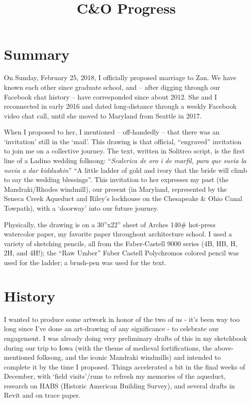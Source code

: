 ﻿\documentclass[letterpaper, 12pt, landscape]{ProgressBook}
\title{C\&O Progress}
\begin{document}
\fancyhead{} %
\cfoot{\makebox[\textwidth][c]{\thepage}}

\section*{Summary}

On Sunday, February 25, 2018, I officially
proposed marriage to Zan. We have known each other since graduate school, and –
after digging through our Facebook chat history – have corresponded since about
2012. She and I reconnected in early 2016 and dated long-distance through a
weekly Facebook video chat call, until she moved to Maryland from Seattle in
2017.

When I proposed to her, I mentioned – off-handedly – that there
was an `invitation' still in the ‘mail’. This drawing is that official,
``engraved'' invitation to join me on a collective journey. The text, written in
Solitreo script, is the first line of a Ladino wedding folksong:
``\textit{Scalerica de oro i de marfil, para que suvia la novia a dar kiddushin}''
``A little ladder of gold and ivory that the bride will climb to say the wedding blessings''.
This invitation to her expresses my past (the Mandraki/Rhodes
windmill), our present (in Maryland, represented by the Seneca Creek Aqueduct
and Riley’s lockhouse on the Chesapeake \& Ohio Canal Towpath), with a
‘doorway’ into our future journey.

Physically, the drawing is on a 30''x22'' sheet of Arches
140\# hot-press watercolor paper, my favorite paper throughout architecture
school. I used a variety of sketching pencils, all from the Faber-Castell 9000 series
(4B, HB, H, 2H, and 4H!); the ``Raw Umber'' Faber Castell Polychromos colored
pencil was used for the ladder; a brush-pen was used for the text.

\section*{History}

I wanted to produce some artwork in honor of the two of us - it's
been way too long since I've done an art-drawing of any significance - to
celebrate our engagement. I was already doing very preliminary drafts of this
in my sketchbook during our trip to Iowa (with the theme of medieval fortifications,
the above-mentioned folksong, and the iconic Mandraki windmills) and intended
to complete it by the time I proposed. Things accelerated a bit in the final
weeks of December, with `field visits'/runs to refresh my memories of the
aqueduct, research on HABS (Historic American Building Survey), and several
drafts in Revit and on trace paper.
\end{document}
